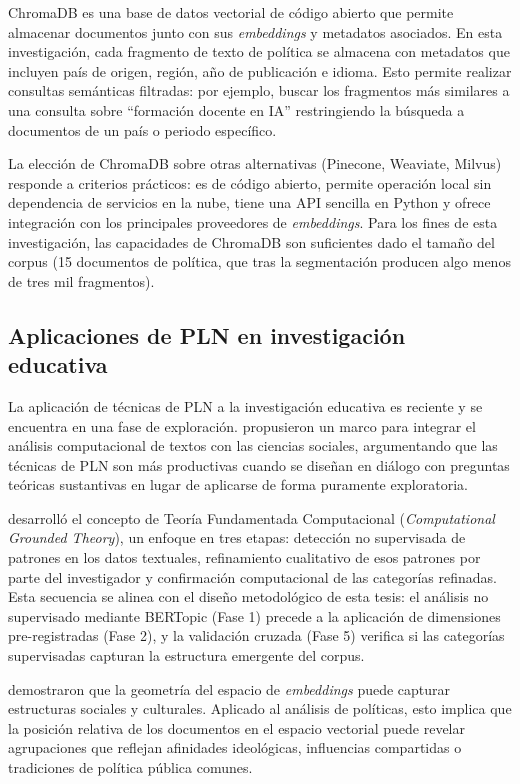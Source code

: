 ChromaDB es una base de datos vectorial de código abierto que permite almacenar documentos junto con sus \textit{embeddings} y metadatos asociados. En esta investigación, cada fragmento de texto de política se almacena con metadatos que incluyen país de origen, región, año de publicación e idioma. Esto permite realizar consultas semánticas filtradas: por ejemplo, buscar los fragmentos más similares a una consulta sobre ``formación docente en IA'' restringiendo la búsqueda a documentos de un país o periodo específico.

La elección de ChromaDB sobre otras alternativas (Pinecone, Weaviate, Milvus) responde a criterios prácticos: es de código abierto, permite operación local sin dependencia de servicios en la nube, tiene una API sencilla en Python y ofrece integración con los principales proveedores de \textit{embeddings}. Para los fines de esta investigación, las capacidades de ChromaDB son suficientes dado el tamaño del corpus (15 documentos de política, que tras la segmentación producen algo menos de tres mil fragmentos).


\subsection{Aplicaciones de PLN en investigación educativa}

La aplicación de técnicas de PLN a la investigación educativa es reciente y se encuentra en una fase de exploración. \citet{nguyen2020words} propusieron un marco para integrar el análisis computacional de textos con las ciencias sociales, argumentando que las técnicas de PLN son más productivas cuando se diseñan en diálogo con preguntas teóricas sustantivas en lugar de aplicarse de forma puramente exploratoria.

\citet{nelson2020computational} desarrolló el concepto de Teoría Fundamentada Computacional (\textit{Computational Grounded Theory}), un enfoque en tres etapas: detección no supervisada de patrones en los datos textuales, refinamiento cualitativo de esos patrones por parte del investigador y confirmación computacional de las categorías refinadas. Esta secuencia se alinea con el diseño metodológico de esta tesis: el análisis no supervisado mediante BERTopic (Fase 1) precede a la aplicación de dimensiones pre-registradas (Fase 2), y la validación cruzada (Fase 5) verifica si las categorías supervisadas capturan la estructura emergente del corpus.

\citet{kozlowski2019geometry} demostraron que la geometría del espacio de \textit{embeddings} puede capturar estructuras sociales y culturales. Aplicado al análisis de políticas, esto implica que la posición relativa de los documentos en el espacio vectorial puede revelar agrupaciones que reflejan afinidades ideológicas, influencias compartidas o tradiciones de política pública comunes.

